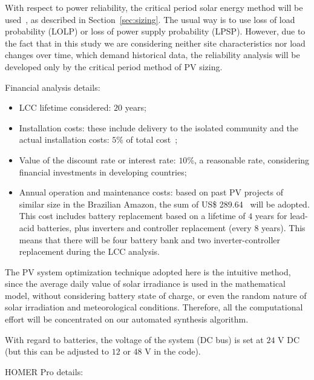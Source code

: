 With respect to power reliability, the critical period solar energy method will be used~\cite{Pinho}, as described in Section~\ref{sec:sizing}. The usual way is to use loss of load probability (LOLP) or loss of power supply probability (LPSP). However, due to the fact that in this study we are considering neither site characteristics nor load changes over time, which demand historical data, the reliability analysis will be developed only by the critical period method of PV sizing.

Financial analysis details:
\begin{itemize}
	\item LCC lifetime considered: $20$ years;
	\item Installation costs: these include delivery to the isolated community and the actual installation costs: $5$\% of total cost~\cite{Agrener2013};
	\item Value of the discount rate or interest rate: $10$\%, a reasonable rate, considering financial investments in developing countries;
	\item Annual operation and maintenance costs: based on past PV projects of similar size in the Brazilian Amazon, the sum of US\$ 289.64~\cite{Agrener2013} will be adopted. This cost includes battery replacement based on a lifetime of $4$ years for lead-acid batteries, plus inverters and controller replacement (every $8$ years). This means that there will be four battery bank and two inverter-controller replacement during the LCC analysis.
\end{itemize}

The PV system optimization technique adopted here is the intuitive method, since the average daily value of solar irradiance is used in the mathematical model, without considering battery state of charge, or even the random nature of solar irradiation and meteorological conditions. Therefore, all the computational effort will be concentrated on our automated synthesis algorithm.

With regard to batteries, the voltage of the system (DC bus) is set at $24$ V DC (but this can be adjusted to $12$ or $48$ V in the code).

HOMER Pro details:


